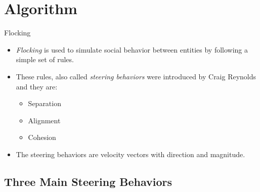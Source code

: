 \documentclass[red]{beamer}
\begin{document}
\section{Algorithm}

\begin{frame}{Flocking}
	\begin{itemize}
		\pause \item \textit{Flocking} is used to simulate social behavior between entities by following a simple set of rules.
		\pause \item These rules, also called \textit{steering behaviors} were introduced by Craig Reynolds and they are:
			\begin{itemize}
				\pause \item Separation
				\pause \item Alignment
				\pause \item Cohesion
			\end{itemize}
		\pause \item The steering behaviors are velocity vectors with direction and magnitude.
	\end{itemize}
\end{frame}

\subsection{Three Main Steering Behaviors}
\end{document}
